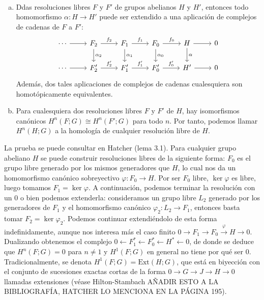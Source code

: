 \documentclass[TA.tex]{subfiles}
\begin{document}
\begin{lemma}\label{3.1}\
\begin{enumerate}[(a)]
\item Ddas resoluciones libres $F$ y $F'$ de grupos abelianos $H$ y $H'$, entonces todo homomorfismo $\alpha:H\to H'$ puede ser extendido a una aplicación de complejos de cadenas de $F$ a $F'$:
\[
\begin{tikzcd}
\cdots\arrow[r]& F_2\arrow[r, "f_2"]\arrow[d, "\alpha_2"] & F_1\arrow[r, "f_1"]\arrow[d, "\alpha_1"] & F_0\arrow[r, "f_0"]\arrow[d, "\alpha_0"]&H\arrow[d, "\alpha"]\arrow[r] & 0\\
\cdots\arrow[r]& F_2'\arrow[r, "f_2'"] & F_1'\arrow[r, "f_1'"] & F_0'\arrow[r, "f_0'"]&H'\arrow[r] & 0
\end{tikzcd}
\]
Además, dos tales aplicaciones de complejos de cadenas cualesquiera son homotópicamente equivalentes.

\item Para cualesquiera dos resoluciones libres $F$ y $F'$ de $H$, hay isomorfismos canónicos $H^n(F;G)\cong H^n(F';G)$ para todo $n$. Por tanto, podemos llamar $H^n(H;G)$ a la homología de cualquier resolución libre de $H$.
\end{enumerate}
\end{lemma}
La prueba se puede consultar en Hatcher (lema 3.1). Para cualquier grupo abeliano $H$ se puede construir resoluciones libres de la siguiente forma: $F_0$ es el grupo libre generado por los mismos generadores que $H$, lo cual nos da un homomorfismo canónico sobreyectivo $\varphi:F_0\to H$. Por ser $F_0$ libre, $\ker\varphi$ es libre, luego tomamos $F_1=\ker\varphi$. A continuación, podemos terminar la resolución con un 0 o bien podemos extenderla: consideramos un grupo libre $L_2$ generado por los generadores de $F_1$ y el homomorfismo canónico $\varphi_2:L_2\to F_1$, entonces basta tomar $F_2=\ker\varphi_2$. Podemos continuar extendiéndolo de esta forma indefinidamente, aunque nos interesa más el caso finito $0\to F_1\to F_0\xrightarrow{\varphi} H\to 0$. Dualizando obtenemos el complejo $0\leftarrow F_1^*\leftarrow F_0^*\leftarrow H^*\leftarrow 0$, de donde se deduce que $H^n(F;G)=0$ para $n\neq 1$ y $H^1(F;G)$ en general no tiene por qué ser 0. Tradicionalmente, se denota $H^1(F;G)=\mathrm{Ext}(H;G)$, que está en biyección con el conjunto de sucesiones exactas cortas de la forma $0\to G\to J\to H\to 0$ llamadas extensiones (véase Hilton-Stambach AÑADIR ESTO A LA BIBLIOGRAFÍA, HATCHER LO MENCIONA EN LA PÁGINA 195).
\end{document}
